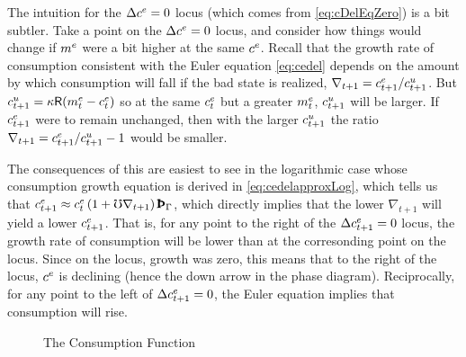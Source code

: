 \documentclass{handout}
\begin{document}
The intuition for the $\Delta \cRatE_{\tSS}=0$ locus (which comes from
\eqref{eq:cDelEqZero}) is a bit subtler.  Take a point on 
the $\Delta \cRatE_{\tSS}=0$ locus, and consider how things 
would change if $m^{e}$ were a bit higher at the same $c^{e}$.  
Recall that the growth rate of consumption consistent with 
the Euler equation \eqref{eq:cedel} depends on the amount by which consumption will
fall if the bad state is realized, $\nabla_{t+1} = c^{e}_{t+1}/c^{u}_{t+1}$.  
But $c^{u}_{t+1} = \kappa \mathsf{R} (m^{e}_{t} - c^{e}_{t})$ so at the same $c^{e}_{t}$ but 
a greater $m^{e}_{t}$, $c^{u}_{t+1}$ will be larger.  If $c^{e}_{t+1}$ were to remain
unchanged, then with the larger $c^{u}_{t+1}$ the ratio $\nabla_{t+1} = c^{e}_{t+1}/c^{u}_{t+1}-1$ would be smaller.

The consequences of this are easiest to see in the logarithmic case whose consumption growth equation is derived in \eqref{eq:cedelapproxLog}, which tells us that $\cRatE_{t+1} \approx \cRatE_{t}\left(1+ \urate \nabla _{t+1}\right) {\PatPGro}$, which directly 
implies that the lower $\nabla_{t+1}$ will yield a lower $c^{e}_{t+1}$.  That is, for any point to the right of the $\Delta c^{e}_{t+1}=0$ locus, the growth rate of consumption will be lower than at the corresonding point on the locus.  Since on the locus, growth
was zero, this means that to the right of the locus, $c^{e}$ is declining (hence the down arrow in the phase diagram).  Reciprocally, for any point to the left of $\Delta c^{e}_{t+1}=0$, the Euler equation implies that consumption will rise.


\begin{figure}
\caption{The Consumption Function}\label{fig:cFunc}
\end{figure}
\end{document}
